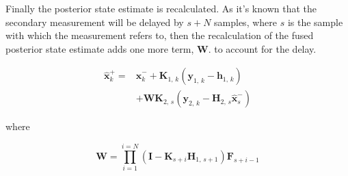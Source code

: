 	Finally the posterior state estimate is recalculated. As it's known that the secondary measurement will be delayed by $s+N$ samples, where $s$ is the sample with which the measurement refers to, then the recalculation of the fused posterior state estimate adds one more term, $\boldsymbol{W}$. to account for the delay.
	
	\begin{equation}
	\begin{aligned}
	\label{eq:x+del}
		\hat{\boldsymbol{x}}_{k}^{+}=&\hat{\boldsymbol{x}}_{k}^{-} + \boldsymbol{K}_{1,\,k}\left(\boldsymbol{y}_{1,\,k}- \boldsymbol{h}_{1,\,k}\right)	\\
		&+ \boldsymbol{W}\boldsymbol{K}_{2,\,s}\left(\boldsymbol{y}_{2,\,k}-\boldsymbol{H}_{2,\,s}\hat{\boldsymbol{x}}_{s}^{-}\right)
	\end{aligned}
	\end{equation}
	
	where
	
	\begin{equation}
	\label{eq:W}
		\boldsymbol{W} = \prod^{i=N}_{i=1}\left(\boldsymbol{I} - \boldsymbol{K}_{s+i}\boldsymbol{H}_{1,\,s+1}\right)\boldsymbol{F}_{s+i-1}
	\end{equation}